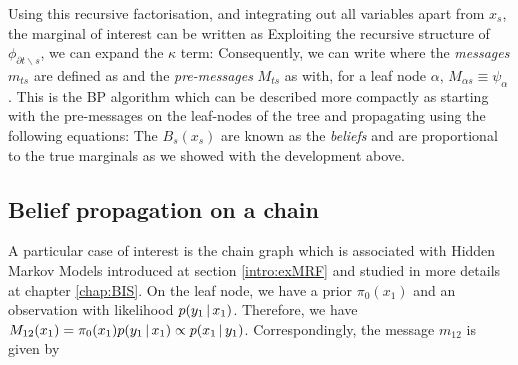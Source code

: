 Using this recursive factorisation, and integrating out all variables apart from $x_{s}$, the marginal of interest can be written as
Exploiting the recursive structure of $\phi_{\partial t\backslash s}$, we can expand the $\kappa$ term:
Consequently, we can write
where the \emph{messages} $m_{ts}$ are defined as
and the \emph{pre-messages} $M_{ts}$ as
with, for a leaf node $\alpha$, $M_{\alpha  s} \equiv \psi_\alpha$. This is the BP algorithm which can be described more compactly as starting with the pre-messages on the leaf-nodes of the tree and propagating using the following equations:
The $B_{s}(x_{s})$ are known as the \emph{beliefs} and are proportional to the true marginals as we showed with the development above. 

\subsection{Belief propagation on a chain}
A particular case of interest is the chain graph which is associated with Hidden Markov Models introduced at section \ref{intro:exMRF} and studied in more details at chapter \ref{chap:BIS}. On the leaf node, we have a prior $\pi_{0}(x_{1})$ and an observation with likelihood $p(y_{1}\,|\, x_{1})$. Therefore, we have $M_{12}(x_{1})=\pi_{0}(x_{1})p(y_{1}\,|\, x_{1})\propto p(x_{1}\,|\, y_{1})$. Correspondingly, the message $m_{12}$ is given by
